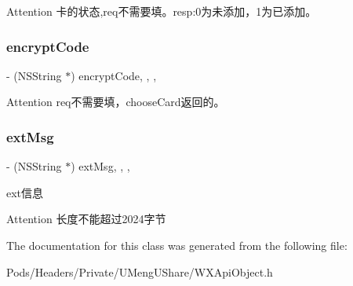 \begin{DoxyAttention}{Attention}
卡的状态,req不需要填。resp\+:0为未添加，1为已添加。 
\end{DoxyAttention}
\mbox{\label{interface_w_x_card_item_a50a4e19e9225ca45b8618c73155b4b63}} 
\subsubsection{\texorpdfstring{encrypt\+Code}{encryptCode}}
{\footnotesize\ttfamily -\/ (N\+S\+String $\ast$) encrypt\+Code\hspace{0.3cm}{\ttfamily [read]}, {\ttfamily [write]}, {\ttfamily [nonatomic]}, {\ttfamily [retain]}}

\begin{DoxyAttention}{Attention}
req不需要填，choose\+Card返回的。 
\end{DoxyAttention}
\mbox{\label{interface_w_x_card_item_afc1c448b8e56aba3534151a587935036}} 
\subsubsection{\texorpdfstring{ext\+Msg}{extMsg}}
{\footnotesize\ttfamily -\/ (N\+S\+String $\ast$) ext\+Msg\hspace{0.3cm}{\ttfamily [read]}, {\ttfamily [write]}, {\ttfamily [nonatomic]}, {\ttfamily [retain]}}

ext信息 \begin{DoxyAttention}{Attention}
长度不能超过2024字节 
\end{DoxyAttention}


The documentation for this class was generated from the following file\+:\begin{DoxyCompactItemize}
\item 
Pods/\+Headers/\+Private/\+U\+Meng\+U\+Share/W\+X\+Api\+Object.\+h\end{DoxyCompactItemize}
